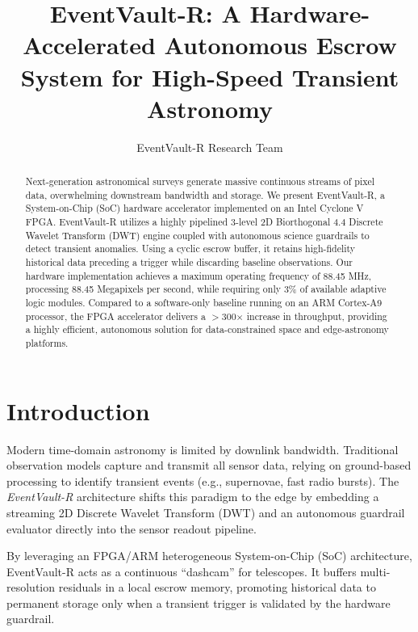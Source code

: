 \documentclass[journal]{IEEEtran}
\begin{document}
\title{EventVault-R: A Hardware-Accelerated Autonomous Escrow System for High-Speed Transient Astronomy}

\author{EventVault-R Research Team}

\maketitle

\begin{abstract}
Next-generation astronomical surveys generate massive continuous streams of pixel data, overwhelming downstream bandwidth and storage. We present EventVault-R, a System-on-Chip (SoC) hardware accelerator implemented on an Intel Cyclone V FPGA. EventVault-R utilizes a highly pipelined 3-level 2D Biorthogonal 4.4 Discrete Wavelet Transform (DWT) engine coupled with autonomous science guardrails to detect transient anomalies. Using a cyclic escrow buffer, it retains high-fidelity historical data preceding a trigger while discarding baseline observations. Our hardware implementation achieves a maximum operating frequency of 88.45 MHz, processing 88.45 Megapixels per second, while requiring only 3\% of available adaptive logic modules. Compared to a software-only baseline running on an ARM Cortex-A9 processor, the FPGA accelerator delivers a $>$300$\times$ increase in throughput, providing a highly efficient, autonomous solution for data-constrained space and edge-astronomy platforms.
\end{abstract}

\section{Introduction}
Modern time-domain astronomy is limited by downlink bandwidth. Traditional observation models capture and transmit all sensor data, relying on ground-based processing to identify transient events (e.g., supernovae, fast radio bursts). The \textit{EventVault-R} architecture shifts this paradigm to the edge by embedding a streaming 2D Discrete Wavelet Transform (DWT) and an autonomous guardrail evaluator directly into the sensor readout pipeline.

By leveraging an FPGA/ARM heterogeneous System-on-Chip (SoC) architecture, EventVault-R acts as a continuous ``dashcam'' for telescopes. It buffers multi-resolution residuals in a local escrow memory, promoting historical data to permanent storage only when a transient trigger is validated by the hardware guardrail.
\end{document}
